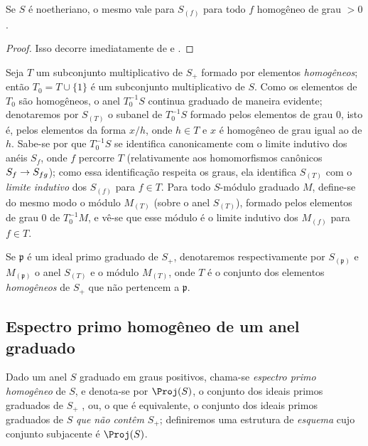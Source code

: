\documentclass[oneside,10pt]{amsart}
\makeatletter
\newcommand{\ega@arrow}[2]{\mathchoice{#1}{#2}{#2}{#2}}
\renewcommand{\to}{\ega@arrow{\longrightarrow}{\rightarrow}}
\let\EGAOriginalLabel\label
\renewcommand{\label}[1]{\phantomsection\EGAOriginalLabel{#1}}
\makeatother
\begin{document}
\begin{corollary}[2.2.6]
\label{II.2.2.6}
Se $S$ é noetheriano, o mesmo vale para $S_{(f)}$ para todo $f$ homogêneo de grau $>0$.
\end{corollary}

\begin{proof}
Isso decorre imediatamente de  e .
\end{proof}

\begin{env}[2.2.7]
\label{II.2.2.7}
Seja $T$ um subconjunto multiplicativo de $S_+$ formado por elementos \emph{homogêneos}; então $T_0=T\cup\{1\}$ é um subconjunto multiplicativo de $S$.
Como os elementos de $T_0$ são homogêneos, o anel $T_0^{-1}S$ continua graduado de maneira evidente; denotaremos por $S_{(T)}$ o subanel de $T_0^{-1}S$ formado pelos elementos de grau $0$, isto é, pelos elementos da forma $x/h$, onde $h\in T$ e $x$ é homogêneo de grau igual ao de $h$.
Sabe-se por  que $T_0^{-1}S$ se identifica canonicamente com o limite indutivo dos anéis $S_f$, onde $f$ percorre $T$ (relativamente aos homomorfismos canônicos $S_f\to S_{fg}$); como essa identificação respeita os graus, ela identifica $S_{(T)}$ com o \emph{limite indutivo} dos $S_{(f)}$ para $f\in T$.
Para todo $S$-módulo graduado $M$, define-se do mesmo modo o módulo $M_{(T)}$ (sobre o anel $S_{(T)}$), formado pelos elementos de grau $0$ de $T_0^{-1}M$, e vê-se que esse módulo é o limite indutivo dos $M_{(f)}$ para $f\in T$.

Se $\mathfrak{p}$ é um ideal primo graduado de $S_+$, denotaremos respectivamente por $S_{(\mathfrak{p})}$ e $M_{(\mathfrak{p})}$ o anel $S_{(T)}$ e o módulo $M_{(T)}$, onde $T$ é o conjunto dos elementos \emph{homogêneos} de $S_+$ que não pertencem a $\mathfrak{p}$.
\end{env}

\subsection{Espectro primo homogêneo de um anel graduado}
\label{subsection:II.2.3}

\begin{env}[2.3.1]
\label{II.2.3.1}
Dado um anel $S$ graduado em graus positivos, chama-se \emph{espectro primo homogêneo} de $S$, e denota-se por $\Proj(S)$, o conjunto dos ideais primos graduados de $S_+$ , ou, o que é equivalente, o conjunto dos ideais primos graduados de $S$ \emph{que não contêm $S_+$}; definiremos uma estrutura de \emph{esquema} cujo conjunto subjacente é $\Proj(S)$.
\end{env}
\end{document}
